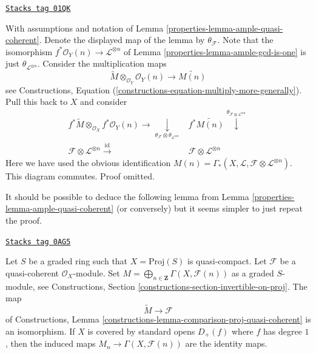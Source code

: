 \begin{remark}[Neurotic]
\label{properties-remark-neurotic}
\href{https://stacks.math.columbia.edu/tag/01QK}{\texttt{Stacks tag 01QK}}

With assumptions and notation of Lemma \ref{properties-lemma-ample-quasi-coherent}.
Denote the displayed map of the lemma by $\theta_\mathcal{F}$.
Note that the isomorphism $f^*\mathcal{O}_Y(n) \to \mathcal{L}^{\otimes n}$
of Lemma \ref{properties-lemma-ample-gcd-is-one} is just
$\theta_{\mathcal{L}^{\otimes n}}$.
Consider the multiplication maps
$$
\widetilde{M} \otimes_{\mathcal{O}_Y} \mathcal{O}_Y(n)
\longrightarrow
\widetilde{M(n)}
$$
see
Constructions, Equation (\ref{constructions-equation-multiply-more-generally}).
Pull this back to $X$ and consider
$$
\begin{array}{cc}f^*\widetilde{M} \otimes_{\mathcal{O}_X} f^*\mathcal{O}_Y(n)
\longrightarrow\underset{\theta_\mathcal{F} \otimes \theta_{\mathcal{L}^{\otimes n}}}{\downarrow} & f^*\widetilde{M(n)}
\overset{\theta_{\mathcal{F} \otimes \mathcal{L}^{\otimes n}}}{\downarrow} \\ \mathcal{F} \otimes \mathcal{L}^{\otimes n} \overset{\text{id}}{\longrightarrow} & \mathcal{F} \otimes \mathcal{L}^{\otimes n}\end{array}
$$
Here we have used the obvious identification
$M(n) = \Gamma_*(X, \mathcal{L}, \mathcal{F} \otimes \mathcal{L}^{\otimes n})$.
This diagram commutes. Proof omitted.
\end{remark}

It should be possible to deduce the following lemma from
Lemma \ref{properties-lemma-ample-quasi-coherent} (or conversely) but it seems
simpler to just repeat the proof.

\begin{lemma}
\label{properties-lemma-proj-quasi-coherent}
\href{https://stacks.math.columbia.edu/tag/0AG5}{\texttt{Stacks tag 0AG5}}

Let $S$ be a graded ring such that $X = \text{Proj}(S)$ is quasi-compact.
Let $\mathcal{F}$ be a quasi-coherent $\mathcal{O}_X$-module. Set
$M = \bigoplus_{n \in \mathbf{Z}} \Gamma(X, \mathcal{F}(n))$ as
a graded $S$-module, see
Constructions, Section \ref{constructions-section-invertible-on-proj}.
The map
$$
\widetilde{M} \longrightarrow \mathcal{F}
$$
of Constructions, Lemma
\ref{constructions-lemma-comparison-proj-quasi-coherent}
is an isomorphism.
If $X$ is covered by standard opens $D_+(f)$ where $f$ has degree $1$,
then the induced maps
$M_n \to \Gamma(X, \mathcal{F}(n))$ are the identity maps.
\end{lemma}

